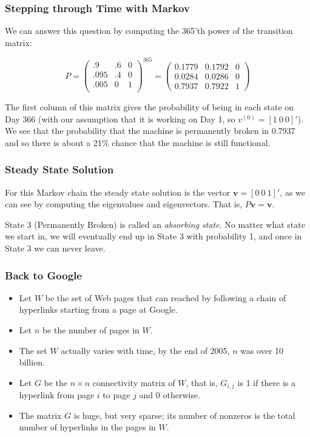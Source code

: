 \documentclass[10pt]{beamer}
\begin{document}
\begin{frame}
\frametitle{Stepping through Time with Markov}

We can answer this question by computing the 365'th power of the
transition matrix:

$$P =
\left(%
\begin{array}{lll}
  .9 & .6 & 0 \\
  .095 & .4 & 0 \\
  .005 & 0 & 1 \\
\end{array}%
\right)^{365} =
\left(%
\begin{array}{lll}
    0.1779 & 0.1792 & 0 \\
    0.0284 & 0.0286 & 0 \\
    0.7937 & 0.7922 & 1
\end{array}%
\right)
$$

The first column of this matrix gives the probability of being in
each state on Day 366 (with our assumption that it is working on
Day 1, so $v^{(0)} = [1~0~0]'$).  We see that the probability that
the machine is permanently broken in 0.7937 and so there is about
a 21\% chance that the machine is still functional.
\end{frame}
\begin{frame}
\frametitle{Steady State Solution}

For this Markov chain the steady state solution is the vector
$\textbf{v} = [0~0~1]'$, as we can see by computing the
eigenvalues and eigenvectors.  That is, $P\textbf{v} =
\textbf{v}$.
\bigskip
\bigskip

State 3 (Permanently Broken) is called an {\it absorbing state}.
No matter what state we start in, we will eventually end up in
State 3 with probability 1, and once in State 3 we can never
leave.
\end{frame}
\begin{frame}
\frametitle{Back to Google}
\begin{itemize}
\item Let $W$ be the set of Web pages that can reached by
following a chain of hyperlinks starting from a page at Google.
\item Let $n$ be the number of pages in $W$.
\item The set $W$ actually varies with time, by the end of 2005,
$n$ was over 10 billion.
\item Let $G$ be the $n \times n$ connectivity matrix of $W$, that
is, $G_{i,j}$ is 1 if there is a hyperlink from page $i$ to page
$j$ and 0 otherwise.
\item The matrix $G$ is huge, but very sparse; its number of
nonzeros is the total number of hyperlinks in the pages in $W$.
\end{itemize}
\end{frame}
\end{document}
